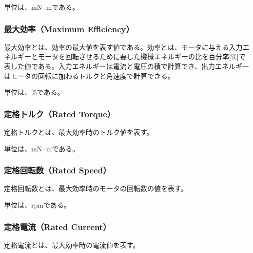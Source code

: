 単位は、$\mathrm{mN \cdot m}$である。
\subsubsection{最大効率（Maximum Efficiency）}\label{sub:sub:saidaikouritu}
最大効率とは、効率の最大値を表す値である。効率とは、モータに与える入力エネルギーとモータを回転させるために要した機械エネルギーの比を百分率[\%]で表した値である。入力エネルギーは電流と電圧の積で計算でき、出力エネルギーはモータの回転に加わるトルクと角速度で計算できる。

単位は、$\mathrm{\%}$である。
\subsubsection{定格トルク（Rated Torque）}\label{sub:sub:teikakutoruku}
定格トルクとは、最大効率時のトルク値を表す。

単位は、$\mathrm{mN \cdot m}$である。
\subsubsection{定格回転数（Rated Speed）}\label{sub:sub:teikakukaiten}
定格回転数とは、最大効率時のモータの回転数の値を表す。

単位は、$\mathrm{rpm}$である。

\subsubsection{定格電流（Rated Current）}\label{sub:sub:teikakuden}
定格電流とは、最大効率時の電流値を表す。

